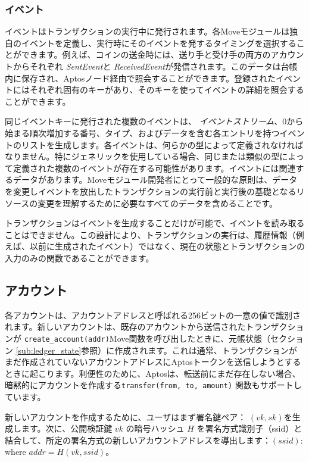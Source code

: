\documentclass{article}
\begin{document}
\subsubsection{イベント}
\label{subsub:events}

イベントはトランザクションの実行中に発行されます。各Moveモジュールは独自のイベントを定義し、実行時にそのイベントを発するタイミングを選択することができます。例えば、コインの送金時には、送り手と受け手の両方のアカウントからそれぞれ \emph{SentEvent}と \emph{ReceivedEvent}が発信されます。このデータは台帳内に保存され、Aptosノード経由で照会することができます。登録されたイベントにはそれぞれ固有のキーがあり、そのキーを使ってイベントの詳細を照会することができます。

同じイベントキーに発行された複数のイベントは、 \emph{イベントストリーム}、0から始まる順次増加する番号、タイプ、およびデータを含む各エントリを持つイベントのリストを生成します。各イベントは、何らかの型によって定義されなければなりません。特にジェネリックを使用している場合、同じまたは類似の型によって定義された複数のイベントが存在する可能性があります。イベントには関連するデータがあります。Moveモジュール開発者にとって一般的な原則は、データを変更しイベントを放出したトランザクションの実行前と実行後の基礎となるリソースの変更を理解するために必要なすべてのデータを含めることです。

トランザクションはイベントを生成することだけが可能で、イベントを読み取ることはできません。この設計により、トランザクションの実行は、履歴情報（例えば、以前に生成されたイベント）ではなく、現在の状態とトランザクションの入力のみの関数であることができます。

\subsection{アカウント}
\label{sec:accounts}

各アカウントは、アカウントアドレスと呼ばれる256ビットの一意の値で識別されます。新しいアカウントは、既存のアカウントから送信されたトランザクションが \texttt{create_account(addr)}Move関数を呼び出したときに、元帳状態（セクション \ref{sub:ledger_state}参照）に作成されます。これは通常、トランザクションがまだ作成されていないアカウントアドレスにAptosトークンを送信しようとするときに起こります。利便性のために、Aptosは、転送前にまだ存在しない場合、暗黙的にアカウントを作成する\texttt{transfer(from, to, amount)} 関数もサポートしています。

新しいアカウントを作成するために、ユーザはまず署名鍵ペア： $(vk, sk)$を生成します。次に、公開検証鍵 $vk$ の暗号ハッシュ $H$ を署名方式識別子（ssid）と結合して、所定の署名方式の新しいアカウントアドレスを導出します：$(ssid)$: where $addr = H(vk, ssid)$。
\end{document}
